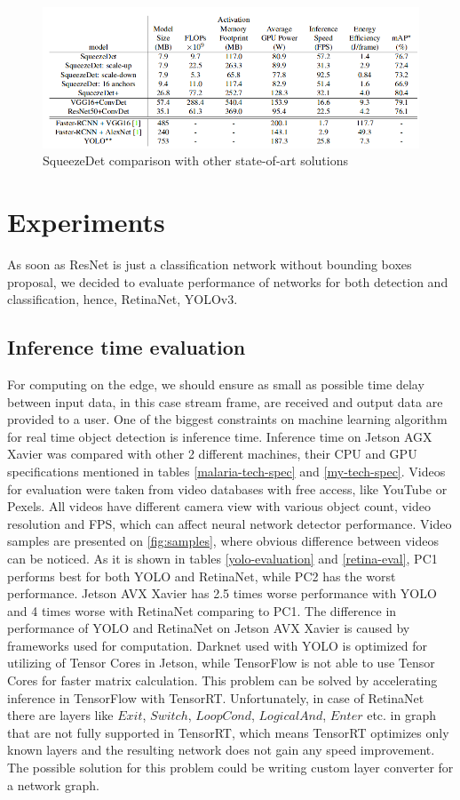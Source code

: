 \documentclass[twoside]{ctuthesis}
\theoremstyle{plain}
\theoremstyle{definition}
\theoremstyle{note}
\begin{document}
\begin{figure}[h]
\caption{SqueezeDet comparison with other state-of-art solutions}
\label{squeezedet_comparasion}
\includegraphics[width=\textwidth]{images/used_networks/squeezedet_comparation.png}
\end{figure}

\chapter{Experiments}

As soon as ResNet is just a classification network without bounding boxes proposal, we decided to evaluate performance of networks for both detection and classification, hence, RetinaNet, YOLOv3.
\section{Inference time evaluation}

For computing on the edge, we should ensure as small as possible time delay between input data, in this case stream frame, are received and output data are provided to a user. 
One of the biggest constraints on machine learning algorithm for real time object detection is inference time.  Inference time on Jetson AGX Xavier was compared with other 2 different machines, their CPU and GPU specifications mentioned in tables \ref{malaria-tech-spec} and \ref{my-tech-spec}. Videos for evaluation were taken from video databases with free access, like YouTube or Pexels. All videos have different camera view with various object count, video resolution and FPS, which can affect neural network detector performance. Video samples are presented on \ref{fig:samples}, where obvious difference between videos can be noticed.  As it is shown in tables \ref{yolo-evaluation} and \ref{retina-eval}, PC1 performs best for both YOLO and RetinaNet, while PC2 has the worst performance. Jetson AVX Xavier has 2.5 times worse performance with YOLO and 4 times worse with RetinaNet comparing to PC1. The difference in performance of YOLO and RetinaNet on Jetson AVX Xavier is caused by frameworks used for computation. Darknet used with YOLO is optimized for utilizing of Tensor Cores in Jetson, while TensorFlow is not able to use Tensor Cores for faster matrix calculation. This problem can be solved by accelerating inference in TensorFlow with TensorRT. Unfortunately, in case of RetinaNet there are layers like $Exit$, $Switch$, $LoopCond$, $LogicalAnd$, $Enter$ etc. in graph that are not fully supported in TensorRT, which means TensorRT optimizes only known layers and the resulting network does not gain any speed improvement. The possible solution for this problem could be writing custom layer converter for a network graph.
\end{document}
